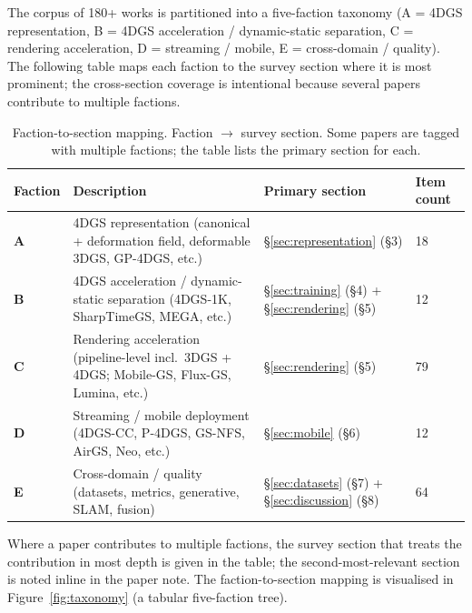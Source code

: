 The corpus of 180+ works is partitioned into a five-faction
taxonomy (A = 4DGS representation, B = 4DGS acceleration /
dynamic-static separation, C = rendering acceleration,
D = streaming / mobile, E = cross-domain / quality). The
following table maps each faction to the survey section
where it is most prominent; the cross-section coverage is
intentional because several papers contribute to multiple
factions.

\begin{table}[h]
\centering
\caption{Faction-to-section mapping. Faction $\to$ survey section. Some papers are tagged with multiple factions; the table lists the primary section for each.}
\label{tab:faction-map}
\footnotesize
\begin{tabular}{llll}
\toprule
\textbf{Faction} & \textbf{Description} & \textbf{Primary section} & \textbf{Item count} \\
\midrule
\textbf{A} & 4DGS representation (canonical + deformation field, deformable 3DGS, GP-4DGS, etc.) & \S\ref{sec:representation} (\S3) & 18 \\
\textbf{B} & 4DGS acceleration / dynamic-static separation (4DGS-1K, SharpTimeGS, MEGA, etc.) & \S\ref{sec:training} (\S4) + \S\ref{sec:rendering} (\S5) & 12 \\
\textbf{C} & Rendering acceleration (pipeline-level incl.\ 3DGS + 4DGS; Mobile-GS, Flux-GS, Lumina, etc.) & \S\ref{sec:rendering} (\S5) & 79 \\
\textbf{D} & Streaming / mobile deployment (4DGS-CC, P-4DGS, GS-NFS, AirGS, Neo, etc.) & \S\ref{sec:mobile} (\S6) & 12 \\
\textbf{E} & Cross-domain / quality (datasets, metrics, generative, SLAM, fusion) & \S\ref{sec:datasets} (\S7) + \S\ref{sec:discussion} (\S8) & 64 \\
\bottomrule
\end{tabular}
\end{table}

Where a paper contributes to multiple factions, the survey
section that treats the contribution in most depth is given
in the table; the second-most-relevant section is noted
inline in the paper note. The faction-to-section mapping is
visualised in Figure~\ref{fig:taxonomy} (a tabular
five-faction tree).

